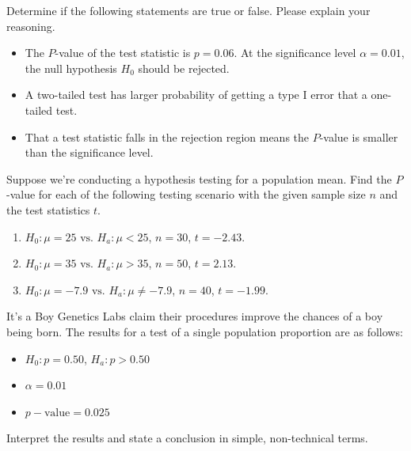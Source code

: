 \begin{exercise}

  Determine if the following statements are true or false. Please explain your reasoning.

  \begin{itemize}
  \item
    The \(P\)-value of the test statistic is \(p = 0.06\). At the
    significance level \(\alpha=0.01\), the null hypothesis \(H_0\)
    should be rejected.
  \item
    A two-tailed test has larger probability of getting a type I error
    that a one-tailed test.
  \item
    That a test statistic falls in the rejection region means the
    \(P\)-value is smaller than the significance level.
  \end{itemize}

\end{exercise}
\vspace*{4\baselineskip}

\begin{exercise}

Suppose we're conducting a hypothesis testing for a population mean.
Find the \(P\)-value for each of the following testing scenario with the
given sample size \(n\) and the test statistics \(t\).

\begin{enumerate}
\item
  \(H_{0}: \mu=25 \text { vs. } H_{a} : \mu<25\), \(n=30\), \(t=-2.43\).
\item
  \(H_{0}: \mu=35 \text { vs. } H_{a} : \mu>35\), \(n=50\), \(t=2.13\).
\item
  \(H_{0}: \mu=-7.9 \text { vs. } H_{a} : \mu\ne-7.9\), \(n=40\),
  \(t=-1.99\).
\end{enumerate}

\end{exercise}

\begin{exercise}

It's a Boy Genetics Labs claim their procedures improve the chances of a
boy being born. The results for a test of a single population proportion
are as follows:

\begin{itemize}
\item
  \(H_0: p=0.50\), \(H_a:p>0.50\)
\item
  \(\alpha=0.01\)
\item
  \(p-\text{value}=0.025\)
\end{itemize}

Interpret the results and state a conclusion in simple, non-technical
terms.

\end{exercise}

